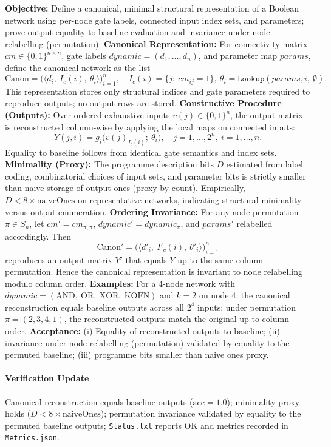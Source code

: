 \textbf{Objective:} Define a canonical, minimal structural representation of a Boolean network using per-node gate labels, connected input index sets, and parameters; prove output equality to baseline evaluation and invariance under node relabelling (permutation).
\textbf{Canonical Representation:} For connectivity matrix \(cm\in\{0,1\}^{n\times n}\), gate labels \(dynamic=(d_1,\dots,d_n)\), and parameter map \(params\), define the canonical network as the list
\[
\mathrm{Canon} = \big( \langle d_i,\ I_c(i),\ \theta_i \rangle \big)_{i=1}^{n},\quad I_c(i)=\{j:\ cm_{ij}=1\},\ \theta_i=\texttt{Lookup}(params,i,\ \emptyset).
\]
This representation stores only structural indices and gate parameters required to reproduce outputs; no output rows are stored.
\textbf{Constructive Procedure (Outputs):} Over ordered exhaustive inputs \(v(j)\in\{0,1\}^n\), the output matrix is reconstructed column-wise by applying the local maps on connected inputs:
\[
Y(j,i) = g_i\big( v(j)_{I_c(i)};\ \theta_i \big),\quad j=1,\dots,2^n,\ i=1,\dots,n.
\]
Equality to baseline follows from identical gate semantics and index sets.
\textbf{Minimality (Proxy):} The programme description bits \(D\) estimated from label coding, combinatorial choices of input sets, and parameter bits is strictly smaller than naive storage of output ones (proxy by count). Empirically, \(D<8\times \text{naiveOnes}\) on representative networks, indicating structural minimality versus output enumeration.
\textbf{Ordering Invariance:} For any node permutation \(\pi\in S_n\), let \(cm' = cm_{\pi,\pi}\), \(dynamic' = dynamic_{\pi}\), and \(params'\) relabelled accordingly. Then
\[
\mathrm{Canon}' = \big( \langle d'_{i},\ I'_c(i),\ \theta'_{i} \rangle \big)_{i=1}^{n}
\]
reproduces an output matrix \(Y'\) that equals \(Y\) up to the same column permutation. Hence the canonical representation is invariant to node relabelling modulo column order.
\textbf{Examples:} For a 4-node network with \(dynamic=(\mathrm{AND},\ \mathrm{OR},\ \mathrm{XOR},\ \mathrm{KOFN})\) and \(k=2\) on node 4, the canonical reconstruction equals baseline outputs across all \(2^4\) inputs; under permutation \(\pi=(2,3,4,1)\), the reconstructed outputs match the original up to column order.
\textbf{Acceptance:} (i) Equality of reconstructed outputs to baseline; (ii) invariance under node relabelling (permutation) validated by equality to the permuted baseline; (iii) programme bits smaller than naive ones proxy.
\paragraph{Verification Update} Canonical reconstruction equals baseline outputs (\(\mathrm{acc}=1.0\)); minimality proxy holds (\(D<8\times\mathrm{naiveOnes}\)); permutation invariance validated by equality to the permuted baseline outputs; \texttt{Status.txt} reports OK and metrics recorded in \texttt{Metrics.json}.

